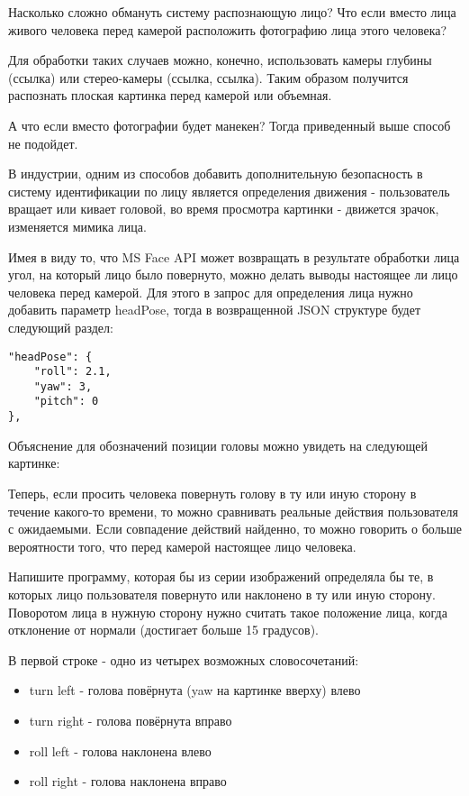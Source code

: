 
Насколько сложно обмануть систему распознающую лицо? Что если вместо лица живого человека перед камерой расположить фотографию лица этого человека?

Для обработки таких случаев можно, конечно, использовать камеры глубины (ссылка) или стерео-камеры (ссылка, ссылка). Таким образом получится распознать плоская картинка перед камерой или объемная.

А что если вместо фотографии будет манекен? Тогда приведенный выше способ не подойдет.

В индустрии, одним из способов добавить дополнительную безопасность в систему идентификации по лицу является определения движения - пользователь вращает или кивает головой, во время просмотра картинки - движется зрачок, изменяется мимика лица.

Имея в виду то, что MS Face API может возвращать в результате обработки лица угол, на который лицо было повернуто, можно делать выводы настоящее ли лицо человека перед камерой. Для этого в запрос для определения лица нужно добавить параметр headPose, тогда в возвращенной JSON структуре будет следующий раздел:

\begin{verbatim}
"headPose": {
    "roll": 2.1,
    "yaw": 3,
    "pitch": 0
},
\end{verbatim}

Объяснение для обозначений позиции головы можно увидеть на следующей картинке:


Теперь, если просить человека повернуть голову в ту или иную сторону в течение какого-то времени, то можно сравнивать реальные действия пользователя с ожидаемыми. Если совпадение действий найденно, то можно говорить о больше вероятности того, что перед камерой настоящее лицо человека.

Напишите программу, которая бы из серии изображений определяла бы те, в которых лицо пользователя повернуто или наклонено в ту или иную сторону. Поворотом лица в нужную сторону нужно считать такое положение лица, когда отклонение от нормали (достигает больше 15 градусов).


В первой строке - одно из четырех возможных словосочетаний:

\begin{itemize}
    \item turn left - голова повёрнута (yaw на картинке вверху) влево
    \item turn right - голова повёрнута вправо
    \item roll left - голова наклонена влево
    \item roll right - голова наклонена вправо
\end{itemize}

